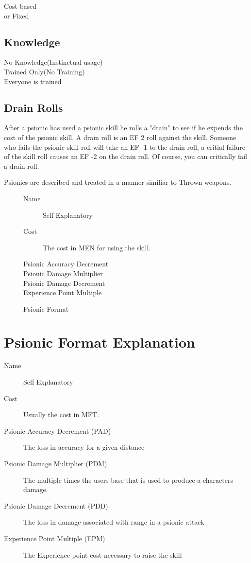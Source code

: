 Cost based \\
or Fixed\\

\subsection{Knowledge}

No Knowledge(Instinctual usage) \\
Trained Only(No Training) \\
Everyone is trained \\


\subsection{Drain Rolls}

After a psionic has used a psionic skill he rolls a 
"drain" to see if he expends the cost of the psionic skill. A drain
roll is an EF 2 roll against the skill. Someone who fails the psionic 
skill roll will take an EF -1 to the drain roll, a critial failure of 
the skill roll causes an EF -2 on the drain roll. Of course, you can
critically fail a drain roll. 

Psionics are described and treated in a manner similiar to Thrown weapons.

\begin{figure}[hb]
\centering
\caption{Psionic Format}
	\begin{description}
	\item[Name] Self Explanatory
	\item[Cost] The cost in MEN for using the skill.
	\item[Psionic Accuracy Decrement] 
	\item[Psionic Damage Multiplier]
	\item[Psionic Damage Decrement]
	\item[Experience Point Multiple]
	\end{description}
\end{figure}

\section{Psionic For\-mat Ex\-pla\-nation}

\begin{description}
	\item[Name]
	Self Explanatory
	\item[Cost]
	Usually the cost in MFT.
	\item[Psionic Accuracy Decrement (PAD)]
	The loss in accuracy for a given distance
	\item[Psionic Damage Multiplier (PDM)]
	The multiple times the users base that is used to produce a characters
	damage.
	\item[Psionic Damage Decrement (PDD)]
	The loss in dam\-age as\-so\-ciated with range in a psionic attack
	\item[Experience Point Multiple (EPM)]
	The Experience point cost necessary to raise the skill
\end{description}

